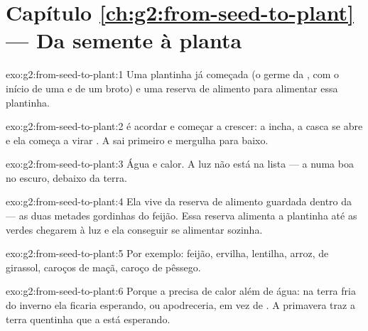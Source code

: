 \section*{Capítulo \ref{ch:g2:from-seed-to-plant} --- Da semente à planta}

\begin{solution}{exo:g2:from-seed-to-plant:1}
Uma plantinha já começada (o germe da , com o início de uma
 e de um broto) e uma reserva de alimento para alimentar essa
plantinha.
\end{solution}

\begin{solution}{exo:g2:from-seed-to-plant:2}
 é acordar e começar a crescer: a  incha, a casca se
abre e ela começa a virar . A  sai primeiro e mergulha
para baixo.
\end{solution}

\begin{solution}{exo:g2:from-seed-to-plant:3}
Água e calor. A luz não está na lista --- a   numa boa
no escuro, debaixo da terra.
\end{solution}

\begin{solution}{exo:g2:from-seed-to-plant:4}
Ela vive da reserva de alimento guardada dentro da  --- as
duas metades gordinhas do feijão. Essa reserva alimenta a plantinha
até as  verdes chegarem à luz e ela conseguir se alimentar
sozinha.
\end{solution}

\begin{solution}{exo:g2:from-seed-to-plant:5}
Por exemplo: feijão, ervilha, lentilha, arroz,  de girassol,
caroços de maçã, caroço de pêssego.
\end{solution}

\begin{solution}{exo:g2:from-seed-to-plant:6}
Porque a  precisa de calor além de água: na terra fria do
inverno ela ficaria esperando, ou apodreceria, em vez de . A
primavera traz a terra quentinha que a  está esperando.
\end{solution}

